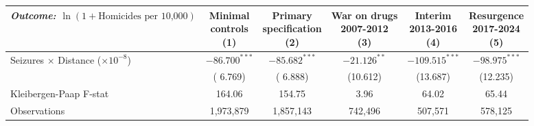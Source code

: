 \begin{tabular}{l c c c c c}
\hline\hline
 {\small \textit{Outcome: $\ln(1+\text{Homicides per 10,000})$}} & \shortstack{Minimal \\ controls \\ (1)} & \shortstack{Primary \\ specification \\ (2)} & \shortstack{War on drugs \\ 2007-2012 \\ (3)} & \shortstack{Interim \\ 2013-2016 \\ (4)} & \shortstack{Resurgence \\ 2017-2024 \\ (5)} \\
\hline
Seizures $\times$ Distance ($\times 10^{-8}$)
 & $-86.700^{***}$ & $-85.682^{***}$ & $-21.126^{**}$ & $-109.515^{***}$ & $-98.975^{***}$ \\
 & ( 6.769) & ( 6.888) & (10.612) & (13.687) & (12.235) \\
\hline
Kleibergen-Paap F-stat
 & 164.06 & 154.75 &   3.96 &  64.02 &  65.44 \\
\hline
Observations
 & 1,973,879 & 1,857,143 &   742,496 &   507,571 &   578,125 \\
\hline\hline
\end{tabular}
